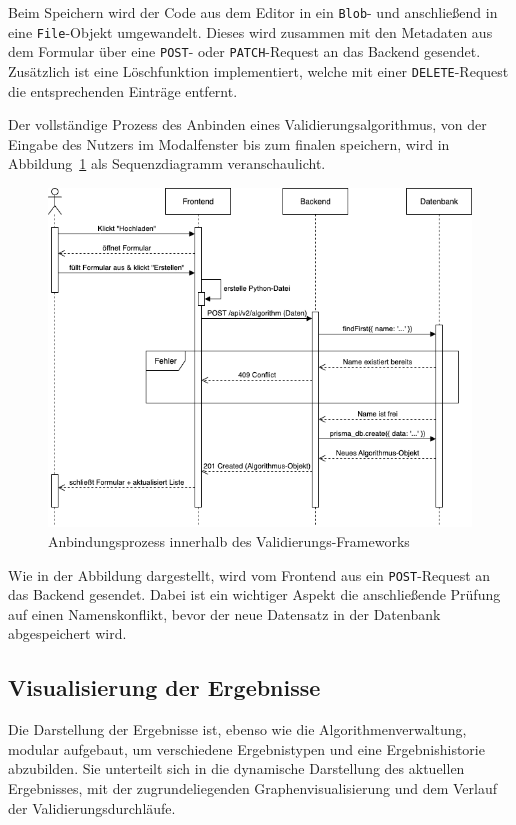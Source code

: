 Beim Speichern wird der Code aus dem Editor in ein \texttt{Blob}- und anschließend in eine \texttt{File}-Objekt umgewandelt. Dieses wird zusammen mit den Metadaten aus dem Formular über eine \texttt{POST}- oder \texttt{PATCH}-Request an das Backend gesendet. Zusätzlich ist eine Löschfunktion implementiert, welche mit einer \texttt{DELETE}-Request die entsprechenden Einträge entfernt.

Der vollständige Prozess des Anbinden eines Validierungsalgorithmus, von der Eingabe des Nutzers im Modalfenster bis zum finalen speichern, wird in Abbildung~\ref{fig:anbindung} als Sequenzdiagramm veranschaulicht.

\begin{figure}[h!]
  \centering
  \includegraphics[width=\textwidth]{figures/05Implementierung/Sequenz_Algo_erstellen.drawio.png}
  \caption{Anbindungsprozess innerhalb des Validierungs-Frameworks}
  \label{fig:anbindung}
\end{figure}

Wie in der Abbildung dargestellt, wird vom Frontend aus ein \texttt{POST}-Request an das Backend gesendet. Dabei ist ein wichtiger Aspekt die anschließende Prüfung auf einen Namenskonflikt, bevor der neue Datensatz in der Datenbank abgespeichert wird.
\subsection{Visualisierung der Ergebnisse}
\label{subsec:visual}
Die Darstellung der Ergebnisse ist, ebenso wie die Algorithmenverwaltung, modular aufgebaut, um verschiedene Ergebnistypen und eine Ergebnishistorie abzubilden. Sie unterteilt sich in die dynamische Darstellung des aktuellen Ergebnisses, mit der zugrundeliegenden Graphenvisualisierung und dem Verlauf der Validierungsdurchläufe.

